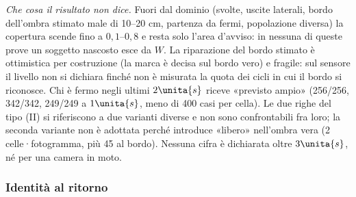 \emph{Che cosa il risultato non dice.} Fuori dal dominio (svolte, uscite laterali, bordo dell'ombra stimato male di 10–20 cm, partenza da fermi, popolazione diversa) la copertura scende fino a $0{,}1$–$0{,}8$ e resta solo l'area d'avviso: in nessuna di queste prove un soggetto nascosto esce da $W$. La riparazione del bordo stimato è ottimistica per costruzione (la marca è decisa sul bordo vero) e fragile: sul sensore il livello non si dichiara finché non è misurata la quota dei cicli in cui il bordo si riconosce. Chi è fermo negli ultimi $2\unita{s}$ riceve «previsto ampio» (256/256, 342/342, 249/249 a $1\unita{s}$, meno di 400 casi per cella). Le due righe del tipo (II) si riferiscono a due varianti diverse e non sono confrontabili fra loro; la seconda variante non è adottata perché introduce «libero» nell'ombra vera (2 celle·fotogramma, più 45 al bordo). Nessuna cifra è dichiarata oltre $3\unita{s}$, né per una camera in moto.

\subsubsection*{Identità al ritorno}

